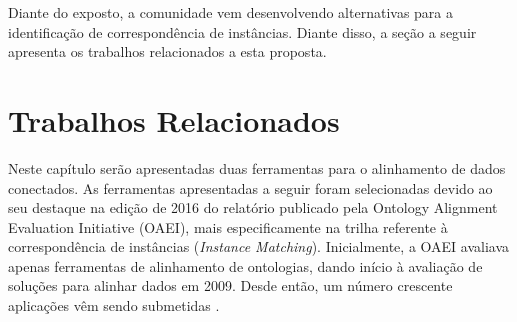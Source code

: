 Diante do exposto, a comunidade vem desenvolvendo alternativas para a identificação de correspondência de instâncias. Diante disso, a seção a seguir apresenta os trabalhos relacionados a esta proposta.
% 
% 
% 

\section{Trabalhos Relacionados}
% 
% 
%
%
\label{cap:relacionados}
Neste capítulo serão apresentadas duas ferramentas para o alinhamento de dados conectados. As ferramentas apresentadas a seguir foram selecionadas  devido ao seu destaque na edição de 2016 do relatório publicado pela Ontology Alignment Evaluation Initiative (OAEI), mais especificamente na trilha referente à correspondência de instâncias (\textit{Instance Matching}). Inicialmente, a OAEI avaliava apenas ferramentas de alinhamento de ontologias, dando início à avaliação de soluções para alinhar dados em 2009. Desde então, um número crescente aplicações vêm sendo submetidas \cite{cheatham2015results}.
% 
% 
%
%
% 
% 
%
%

